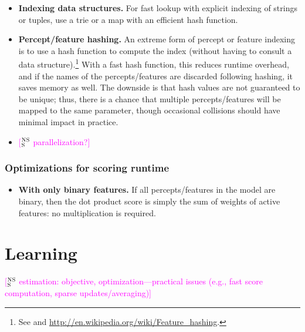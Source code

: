 \documentclass[11pt,letterpaper]{article}
\newcommand{\ensuretext}[1]{#1}
\newcommand{\nssmarker}{\ensuretext{\textcolor{magenta}{\ensuremath{^{\textsc{NS}}_{\textsc{S}}}}}}
\newcommand{\arkcomment}[3]{\ensuretext{\textcolor{#3}{[#1 #2]}}}
\newcommand{\nss}[1]{\arkcomment{\nssmarker}{#1}{magenta}}
\begin{document}
\begin{itemize}
  \item \textbf{Indexing data structures.} For fast lookup with explicit indexing of strings or tuples, 
use a trie or a map with an efficient hash function.

  \item \textbf{Percept/feature hashing.} An extreme form of percept or feature indexing is to use a hash function to compute the index 
(without having to consult a data structure).\footnote{See \citep{weinberger-09} and \url{http://en.wikipedia.org/wiki/Feature_hashing}.}
With a fast hash function, this reduces runtime overhead, 
and if the names of the percepts\slash features are discarded following hashing, it saves memory as well.
The downside is that hash values are not guaranteed to be unique; 
thus, there is a chance that multiple percepts\slash features will 
be mapped to the same parameter, though occasional collisions should have minimal impact in practice. 

  \item \nss{parallelization?}
\end{itemize}

\subsubsection{Optimizations for scoring runtime}

\begin{itemize}
\item \textbf{With only binary features.} If all percepts\slash features in the model are binary, 
then the dot product score is simply the sum of weights of active features: no multiplication is required.
\end{itemize}



\section{Learning}\label{sec:learning}

\nss{estimation: objective, optimization---practical issues (e.g., fast score computation, sparse updates/averaging)}
\end{document}

